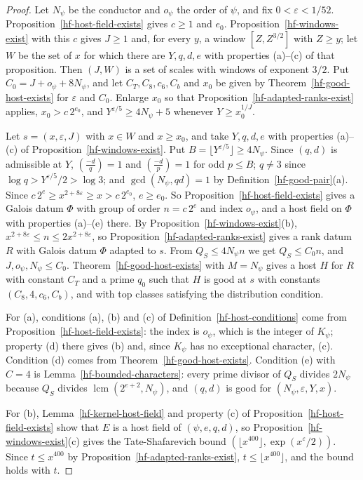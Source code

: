 \begin{proof}
Let $N_\psi$ be the conductor and $o_\psi$ the order of $\psi$, and fix $0<\varepsilon<1/52$.
Proposition~\ref{hf-host-field-exists} gives $c\geq1$ and $e_0$. Proposition~\ref{hf-windows-exist}
with this $c$ gives $J\geq1$ and, for every $y$, a window $[Z,Z^{3/2}]$ with $Z\geq y$; let $W$ be the
set of $x$ for which there are $Y,q,d,e$ with properties (a)--(c) of that proposition. Then $(J,W)$ is a set of scales
with windows of exponent $3/2$. Put $C_0=J+o_\psi+8N_\psi$, and let $C_T,C_8,c_6,C_b$ and $x_0$ be
given by Theorem~\ref{hf-good-host-exists} for $\varepsilon$ and $C_0$. Enlarge $x_0$ so that
Proposition~\ref{hf-adapted-ranks-exist} applies, $x_0>c\,2^{e_0}$, and $Y^{\varepsilon/5}\geq
4N_\psi+5$ whenever $Y\geq x_0^{1/J}$.

Let $s=(x,\varepsilon,J)$ with $x\in W$ and $x\geq x_0$, and take $Y,q,d,e$ with properties
(a)--(c) of Proposition~\ref{hf-windows-exist}. Put $B=\lfloor Y^{\varepsilon/5}\rfloor\geq4N_\psi$. Since
$(q,d)$ is admissible at $Y$, $\left(\frac{-d}{q}\right)=1$ and $\left(\frac{-d}{p}\right)=1$ for odd
$p\leq B$; $q\neq3$ since $\log q>Y^{\varepsilon/5}/2>\log3$; and $\gcd(N_\psi,qd)=1$ by
Definition~\ref{hf-good-pair}(a). Since
$c\,2^e\geq x^{2+8\varepsilon}\geq x>c\,2^{e_0}$, $e\geq e_0$. So
Proposition~\ref{hf-host-field-exists} gives a Galois datum $\Phi$ with group of order $n=c\,2^e$ and index
$o_\psi$, and a host field on $\Phi$ with properties (a)--(e) there. By
Proposition~\ref{hf-windows-exist}(b), $x^{2+8\varepsilon}\leq n\leq2x^{2+8\varepsilon}$, so
Proposition~\ref{hf-adapted-ranks-exist} gives a rank datum $R$ with Galois datum $\Phi$ adapted to $s$. From
$Q_S\leq4N_\psi n$ we get $Q_S\leq C_0n$, and $J,o_\psi,N_\psi\leq C_0$. Theorem~\ref{hf-good-host-exists}
with $M=N_\psi$ gives a host $H$ for $R$ with constant $C_T$ and a prime $q_0$ such that $H$ is good
at $s$ with constants $(C_8,4,c_6,C_b)$, and with top classes satisfying the distribution condition.

For (a), conditions (a), (b) and (c) of Definition~\ref{hf-host-conditions} come from
Proposition~\ref{hf-host-field-exists}: the index is $o_\psi$, which is the integer of $K_\psi$;
property (d) there gives (b) and, since $K_\psi$ has no exceptional character, (c). Condition (d)
comes from Theorem~\ref{hf-good-host-exists}. Condition (e) with $C=4$ is
Lemma~\ref{hf-bounded-characters}: every prime divisor of $Q_S$ divides $2N_\psi$ because $Q_S$
divides $\operatorname{lcm}(2^{e+2},N_\psi)$, and $(q,d)$ is good for $(N_\psi,\varepsilon,Y,x)$.

For (b), Lemma~\ref{hf-kernel-host-field} and property (c) of Proposition~\ref{hf-host-field-exists}
show that $E$ is a host field of $(\psi,e,q,d)$, so Proposition~\ref{hf-windows-exist}(c) gives the
Tate-Shafarevich bound $(\lfloor x^{400}\rfloor,\exp(x^\varepsilon/2))$. Since $t\leq x^{400}$ by
Proposition~\ref{hf-adapted-ranks-exist}, $t\leq\lfloor x^{400}\rfloor$, and the bound holds with
$t$.
\end{proof}
